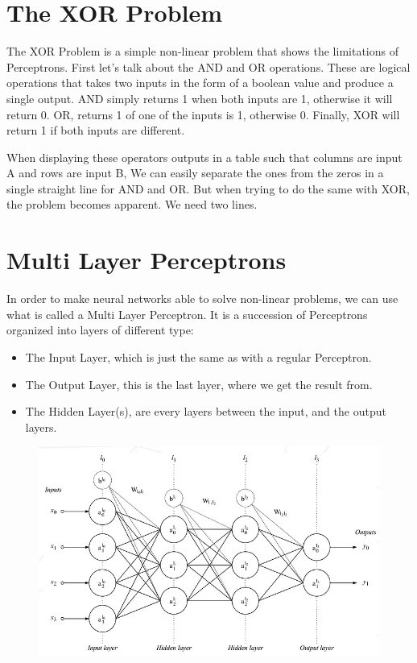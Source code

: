 \documentclass{article}
\begin{document}
\newpage

\section{The XOR Problem}
    
The XOR Problem is a simple non-linear problem that shows the limitations of Perceptrons. First let's talk about the AND and OR operations. These are logical operations that takes two inputs in the form of a boolean value and produce a single output. AND simply returns 1 when both inputs are 1, otherwise it will return 0. OR, returns 1 of one of the inputs is 1, otherwise 0. Finally, XOR will return 1 if both inputs are different.

When displaying these operators outputs in a table such that columns are input A and rows are input B, We can easily separate the ones from the zeros in a single straight line for AND and OR. But when trying to do the same with XOR, the problem becomes apparent. We need two lines.

\section{Multi Layer Perceptrons}

In order to make neural networks able to solve non-linear problems, we can use what is called a Multi Layer Perceptron. It is a succession of Perceptrons organized into layers of different type: 

\begin{itemize}
    \item The Input Layer, which is just the same as with a regular Perceptron.
    \item The Output Layer, this is the last layer, where we get the result from.
    \item The Hidden Layer(s), are every layers between the input, and the output layers.
\end{itemize}

\begin{figure}[!h]
    \centering
    \includegraphics[width=.75\linewidth]{assets/cover.png}
    \label{fig:multi-layer-perceptrons}
\end{figure}
\end{document}
